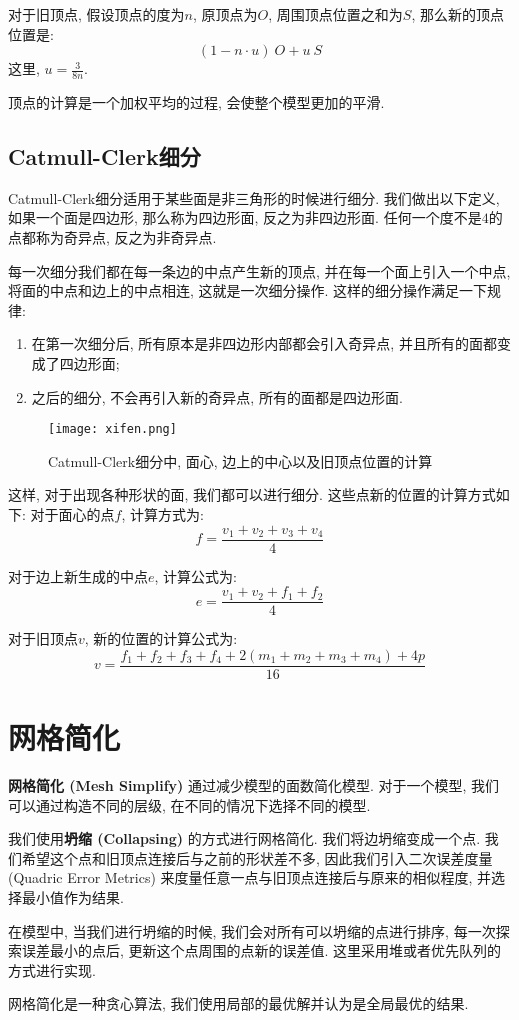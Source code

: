 对于旧顶点, 假设顶点的度为$n$, 原顶点为$O$, 周围顶点位置之和为$S$, 那么新的顶点位置是: 
\begin{equation}
	(1-n\cdot u)\ O+u\ S
\end{equation}
这里, $u=\frac{3}{8n}$. 

顶点的计算是一个加权平均的过程, 会使整个模型更加的平滑. 

\subsection{Catmull-Clerk细分}
Catmull-Clerk细分适用于某些面是非三角形的时候进行细分. 我们做出以下定义, 如果一个面是四边形, 那么称为四边形面, 反之为非四边形面. 任何一个度不是$4$的点都称为奇异点, 反之为非奇异点. 

每一次细分我们都在每一条边的中点产生新的顶点, 并在每一个面上引入一个中点, 将面的中点和边上的中点相连, 这就是一次细分操作. 这样的细分操作满足一下规律: 
\begin{enumerate}
	\item 在第一次细分后, 所有原本是非四边形内部都会引入奇异点, 并且所有的面都变成了四边形面; 
	\item 之后的细分, 不会再引入新的奇异点, 所有的面都是四边形面. 
\end{enumerate}

\begin{figure}[H]
	\centering
	\texttt{[image: xifen.png]}
	\caption{Catmull-Clerk细分中, 面心, 边上的中心以及旧顶点位置的计算}
	\label{fig:xifen}
\end{figure}
这样, 对于出现各种形状的面, 我们都可以进行细分. 这些点新的位置的计算方式如下: 
对于面心的点$f$, 计算方式为: 
\begin{equation}
	f=\frac{v_1+v_2+v_3+v_4}{4}
\end{equation}

对于边上新生成的中点$e$, 计算公式为:
\begin{equation}
	e=\frac{v_1+v_2+f_1+f_2}{4}
\end{equation}

对于旧顶点$v$, 新的位置的计算公式为: 
\begin{equation}
	v=\frac{f_1+f_2+f_3+f_4+2(m_1+m_2+m_3+m_4)+4p}{16}
\end{equation}

\section{网格简化}
\textbf{网格简化 (Mesh Simplify) }通过减少模型的面数简化模型. 对于一个模型, 我们可以通过构造不同的层级, 在不同的情况下选择不同的模型. 

我们使用\textbf{坍缩 (Collapsing) }的方式进行网格简化. 我们将边坍缩变成一个点. 我们希望这个点和旧顶点连接后与之前的形状差不多, 因此我们引入二次误差度量 (Quadric Error Metrics) 来度量任意一点与旧顶点连接后与原来的相似程度, 并选择最小值作为结果. 

在模型中, 当我们进行坍缩的时候, 我们会对所有可以坍缩的点进行排序, 每一次探索误差最小的点后, 更新这个点周围的点新的误差值. 这里采用堆或者优先队列的方式进行实现. 

网格简化是一种贪心算法, 我们使用局部的最优解并认为是全局最优的结果. 
